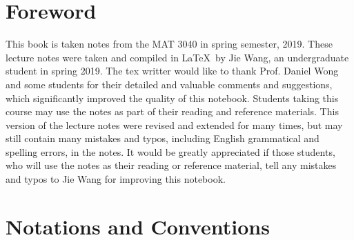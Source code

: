 \documentclass[11pt]{article}
\begin{document}
\begin{center}
\end{center}


\author{Prof. Daniel Wong and Prof. Jie Wang}

\newpage
\tableofcontents

\newpage
\section*{Foreword}

This book is taken notes from the MAT 3040 in spring semester, 2019. These lecture notes were taken and compiled in \LaTeX\ by Jie Wang, an undergraduate student in spring 2019. The tex writter would like to thank Prof. Daniel Wong and some students for their detailed and valuable comments and suggestions, which significantly improved the quality of this notebook. Students taking this course may use the notes as part of their reading and reference materials. This version of the lecture notes were revised and extended for many times, but may still contain many mistakes and typos, including English grammatical and spelling errors, in the notes. It would be greatly appreciated if those students, who will use the notes as their reading or reference material, tell any mistakes and typos to Jie Wang for improving this notebook.

\newpage
\section*{Notations and Conventions}
\end{document}
